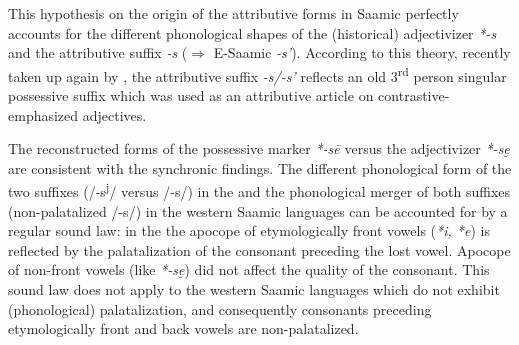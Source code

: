 {This hypothesis on the origin of the attributive forms in Saamic perfectly accounts for the different phonological shapes of the (historical) adjectivizer \mbox{\textit{*-s}} and the attributive suffix \textit{-s} ($\Rightarrow$ E-Saamic \textit{-s'}). According to this theory, recently taken up again by \citet{riesler2006b}, the attributive suffix \textit{-s/-s'} reflects an old 3\textsuperscript{rd} person singular possessive suffix which was used as an attributive article on contrastive-emphasized adjectives.

The reconstructed  forms of the possessive marker \textit{*-sē} \citep[73]{sammallahti1998b} versus the adjectivizer \textit{*-se̮} are consistent with the synchronic findings. The different phonological form of the two suffixes (/-s\textsuperscript{j}/ versus /-s/) in the  and the phonological merger of both suffixes (non-palatalized /-s/) in the western Saamic languages can be accounted for by a regular sound law: in the  the apocope of etymologically front vowels (\textit{*i, *e}) is reflected by the palatalization of the consonant preceding the lost vowel. Apocope of non-front vowels (like \textit{*-se̮}) did not affect the quality of the consonant. This sound law does not apply to the western Saamic languages which do not exhibit (phonological) palatalization, and consequently consonants preceding etymologically front and back vowels are non-palatalized.
\begin{exe}
\settowidth{}
\ex
\begin{xlist}
\begin{xlist}
\end{xlist}
\begin{xlist}
\end{xlist}
\end{xlist}
\end{exe}

}
